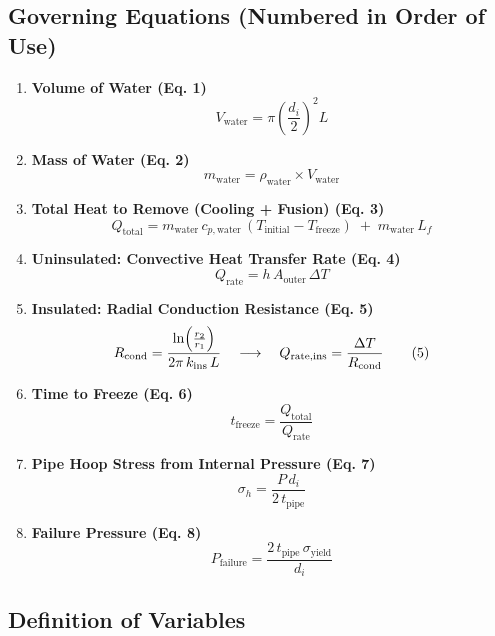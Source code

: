 \documentclass[12pt]{article}
\begin{document}
\subsection*{Governing Equations (Numbered in Order of Use)}

\begin{enumerate}
    \item \textbf{Volume of Water (Eq. 1)}  
    \[
    V_{\text{water}} 
    = \pi \left(\frac{d_i}{2}\right)^2 L
    \tag{1}
    \]
    
    \item \textbf{Mass of Water (Eq. 2)}  
    \[
    m_{\text{water}}
    = \rho_{\text{water}} \times V_{\text{water}}
    \tag{2}
    \]

    \item \textbf{Total Heat to Remove (Cooling + Fusion) (Eq. 3)}  
    \[
    Q_{\text{total}} 
    = m_{\text{water}}\,c_{p,\text{water}}\,(T_{\text{initial}} - T_{\text{freeze}})
      \;+\; m_{\text{water}}\,L_f
    \tag{3}
    \]
    
    \item \textbf{Uninsulated: Convective Heat Transfer Rate (Eq. 4)}  
    \[
    Q_{\text{rate}} 
    = h\,A_{\text{outer}}\,\Delta T
    \tag{4}
    \]
    
    \item \textbf{Insulated: Radial Conduction Resistance (Eq. 5)}  
    \[
    R_{\text{cond}}
    = \frac{\ln\Bigl(\tfrac{r_2}{r_1}\Bigr)}{2\pi \, k_{\text{ins}} \, L}
    \quad\longrightarrow\quad
    Q_{\text{rate,ins}} 
    = \frac{\Delta T}{R_{\text{cond}}}
    \tag{5}
    \]
    
    \item \textbf{Time to Freeze (Eq. 6)}  
    \[
    t_{\text{freeze}} 
    = \frac{Q_{\text{total}}}{Q_{\text{rate}}}
    \tag{6}
    \]
    
    \item \textbf{Pipe Hoop Stress from Internal Pressure (Eq. 7)}  
    \[
    \sigma_h 
    = \frac{P\,d_i}{2\,t_{\text{pipe}}}
    \tag{7}
    \]
    
    \item \textbf{Failure Pressure (Eq. 8)}  
    \[
    P_{\text{failure}} 
    = \frac{2\,t_{\text{pipe}}\,\sigma_{\text{yield}}}{d_i}
    \tag{8}
    \]
\end{enumerate}

\subsection*{Definition of Variables}
\end{document}
